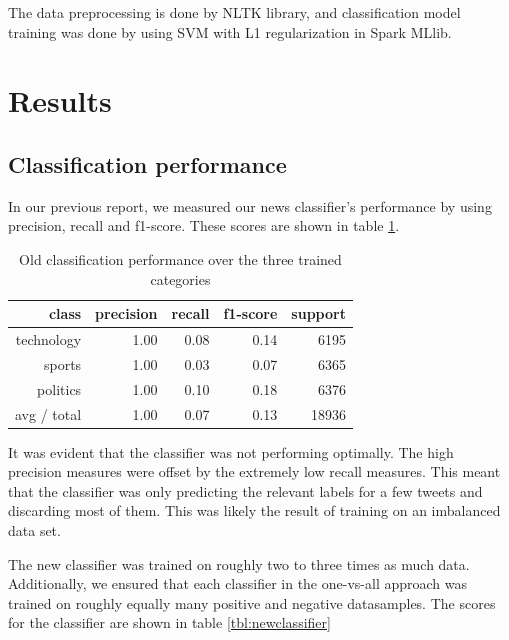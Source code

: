 \documentclass{llncs}
\begin{document}
The data preprocessing is done by NLTK library, and classification model training was done by using SVM with L1 regularization in Spark MLlib. 

\section{Results}

\subsection{Classification performance}

In our previous report, we measured our news classifier's performance by using precision, recall and f1-score. These scores are shown in table \ref{tbl:oldclassifier}.

\begin{table}
	\begin{center}
		\begin{tabular}{|r|r|r|r|r|} \hline
			class  & precision   & recall & f1-score  & support \\ \hline
			technology    &   1.00 &     0.08  &    0.14   &   6195 \\
			sports   &    1.00   &   0.03   &   0.07   &   6365 \\
			politics   &    1.00  &    0.10   &   0.18   &   6376 \\
			avg / total  &     1.00   &   0.07  &    0.13   &  18936 \\ \hline
		\end{tabular}
	\end{center}
	\caption{Old classification performance over the three trained categories}
	\label{tbl:oldclassifier}
\end{table}

It was evident that the classifier was not performing optimally. The high precision measures were offset by the extremely low recall measures. This meant that the classifier was only predicting the relevant labels for a few tweets and discarding most of them. This was likely the result of training on an imbalanced data set.

The new classifier was trained on roughly two to three times as much data. Additionally, we ensured that each classifier in the one-vs-all approach was trained on roughly equally many positive and negative datasamples. The scores for the classifier are shown in table \ref{tbl:newclassifier}
\end{document}
